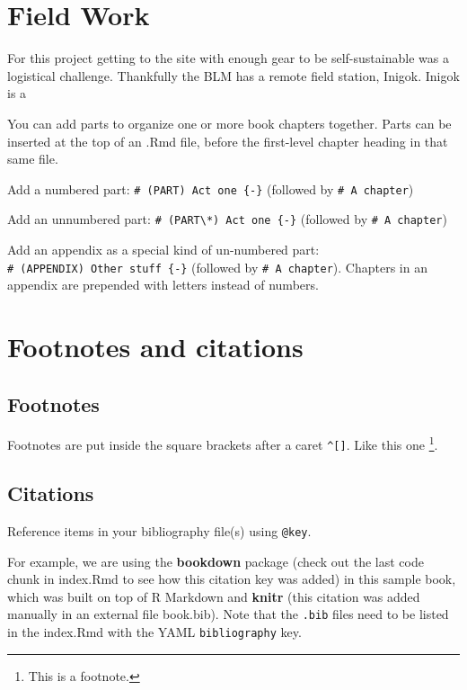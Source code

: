 \documentclass[
]{book}
\theoremstyle{definition}
\theoremstyle{definition}
\theoremstyle{definition}
\theoremstyle{definition}
\theoremstyle{remark}
\begin{document}
\hypertarget{field-work}{%
\chapter{Field Work}\label{field-work}}

For this project getting to the site with enough gear to be self-sustainable was a logistical challenge. Thankfully the BLM has a remote field station, Inigok. Inigok is a

You can add parts to organize one or more book chapters together. Parts can be inserted at the top of an .Rmd file, before the first-level chapter heading in that same file.

Add a numbered part: \texttt{\#\ (PART)\ Act\ one\ \{-\}} (followed by \texttt{\#\ A\ chapter})

Add an unnumbered part: \texttt{\#\ (PART\textbackslash{}*)\ Act\ one\ \{-\}} (followed by \texttt{\#\ A\ chapter})

Add an appendix as a special kind of un-numbered part: \texttt{\#\ (APPENDIX)\ Other\ stuff\ \{-\}} (followed by \texttt{\#\ A\ chapter}). Chapters in an appendix are prepended with letters instead of numbers.

\hypertarget{footnotes-and-citations}{%
\chapter{Footnotes and citations}\label{footnotes-and-citations}}

\hypertarget{footnotes}{%
\section{Footnotes}\label{footnotes}}

Footnotes are put inside the square brackets after a caret \texttt{\^{}{[}{]}}. Like this one \footnote{This is a footnote.}.

\hypertarget{citations}{%
\section{Citations}\label{citations}}

Reference items in your bibliography file(s) using \texttt{@key}.

For example, we are using the \textbf{bookdown} package \citep{R-bookdown} (check out the last code chunk in index.Rmd to see how this citation key was added) in this sample book, which was built on top of R Markdown and \textbf{knitr} \citep{xie2015} (this citation was added manually in an external file book.bib).
Note that the \texttt{.bib} files need to be listed in the index.Rmd with the YAML \texttt{bibliography} key.
\end{document}
